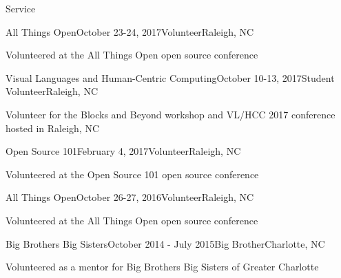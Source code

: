 \documentclass{resume} %
\begin{document}
\begin{rSection}{Service}
\begin{rSubsection}{All Things Open}{October 23-24, 2017}{Volunteer}{Raleigh, NC}
\item Volunteered at the All Things Open open source conference
\end{rSubsection}
\begin{rSubsection}{Visual Languages and Human-Centric Computing}{October 10-13, 2017}{Student Volunteer}{Raleigh, NC}
\item Volunteer for the Blocks and Beyond workshop and VL/HCC 2017 conference hosted in Raleigh, NC
\end{rSubsection}
\begin{rSubsection}{Open Source 101}{February 4, 2017}{Volunteer}{Raleigh, NC}
\item Volunteered at the Open Source 101 open source conference
\end{rSubsection}
\begin{rSubsection}{All Things Open}{October 26-27, 2016}{Volunteer}{Raleigh, NC}
\item Volunteered at the All Things Open open source conference
\end{rSubsection}
\begin{rSubsection}{Big Brothers Big Sisters}{October 2014 - July 2015}{Big Brother}{Charlotte, NC}
\item Volunteered as a mentor for Big Brothers Big Sisters of Greater Charlotte
\end{rSubsection}
\end{rSection}
\end{document}
